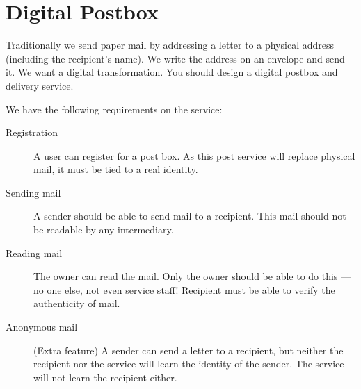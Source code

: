 \mode*

\section{Digital Postbox}

Traditionally we send paper mail by addressing a letter to a physical address 
(including the recipient's name).
We write the address on an envelope and send it.
We want a digital transformation.
You should design a digital postbox and delivery service.


We have the following requirements on the service:
\begin{frame}
\begin{description}
  \item[Registration]
    A user can register for a post box.
    As this post service will replace physical mail, it must be tied to a real 
    identity.

    \pause

  \item[Sending mail]
    A sender should be able to send mail to a recipient.
    This mail should not be readable by any intermediary.

  \item[Reading mail]
    The owner can read the mail.
    Only the owner should be able to do this --- no one else, not even service 
    staff!
    Recipient must be able to verify the authenticity of mail.

    \pause

  \item[Anonymous mail] (Extra feature)
    A sender can send a letter to a recipient, but neither the recipient nor 
    the service will learn the identity of the sender.
    The service will not learn the recipient either.
\end{description}
\end{frame}

